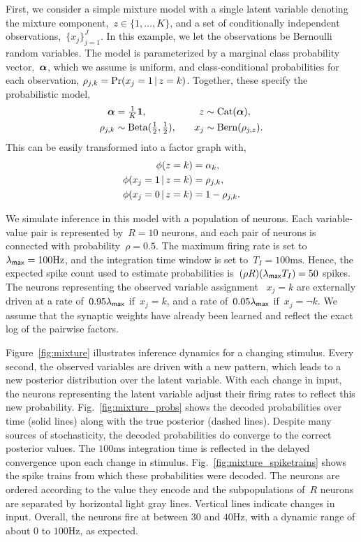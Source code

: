 First, we consider a simple mixture model with a single
latent variable denoting the mixture component,~$z \in \{1, \ldots, K\}$,
and a set of conditionally independent observations,~$\{x_j\}_{j=1}^J$.
In this example, we let the observations be Bernoulli
random variables. The model is parameterized by a marginal
class probability vector,~$\boldsymbol{\alpha}$, which we assume is uniform,
and class-conditional probabilities for each observation,
${\rho_{j,k} = \Pr(x_j=1 \,|\, z=k)}$. Together, these
specify the probabilistic model,
\begin{align}
  \boldsymbol{\alpha} &= \tfrac{1}{K} \boldsymbol{1}, & & &
    z &\sim \mathrm{Cat}(\boldsymbol{\alpha}), \\
  \rho_{j,k} &\sim \mathrm{Beta}(\tfrac{1}{2},\tfrac{1}{2}),  & & &
  x_j &\sim \mathrm{Bern}(\rho_{j,z}).  
\end{align}
This can be easily transformed into a factor graph with,
\begin{align}
  \phi(z=k) &= \alpha_k, \\
  \phi(x_j=1 \,|\, z=k) &= \rho_{j,k}, \\
  \phi(x_j=0 \,|\, z=k) &= 1-\rho_{j,k}.
\end{align}

We simulate inference in this model with a population of neurons.
Each variable-value pair is represented by~$R=10$ neurons, and each
pair of neurons is connected with probability~$\rho=0.5$. The maximum
firing rate is set to~$\lambda_{\mathsf{max}}=100\text{Hz}$, and the integration
time window is set to~$T_I=100\text{ms}$. Hence, the expected spike
count used to estimate probabilities is~$(\rho R)(\lambda_{\mathsf{max}} T_I)
= 50$ spikes. The neurons representing the observed variable assignment
~$x_j=k$ are externally driven at a rate of~$0.95 \lambda_{\mathsf{max}}$ if~$x_j=k$,
and a rate of~$0.05 \lambda_{\mathsf{max}}$ if~$x_j=\neg k$. We assume that the
synaptic weights have already been learned and reflect the exact
log of the pairwise factors. 

Figure~\ref{fig:mixture} illustrates inference dynamics for a
changing stimulus. Every second, the observed variables are driven with
a new pattern, which leads to a new posterior distribution over the
latent variable. With each change in input, the neurons representing the
latent variable adjust their firing rates to reflect this new probability.
Fig.~\ref{fig:mixture_probs} shows the decoded probabilities over time
(solid lines) along with the true posterior (dashed lines). Despite many
sources of stochasticity, the decoded probabilities do converge to
the correct posterior values. The $100$ms integration time is reflected in
the delayed convergence upon each change in stimulus.
Fig.~\ref{fig:mixture_spiketrains} shows the spike trains from which these
probabilities were decoded. The neurons are ordered according to
the value they encode and the subpopulations of~$R$ neurons are
separated by horizontal light gray lines. Vertical lines indicate changes
in input. Overall, the neurons fire at between $30$ and $40$Hz, with a
dynamic range of about $0$ to $100$Hz, as expected.



